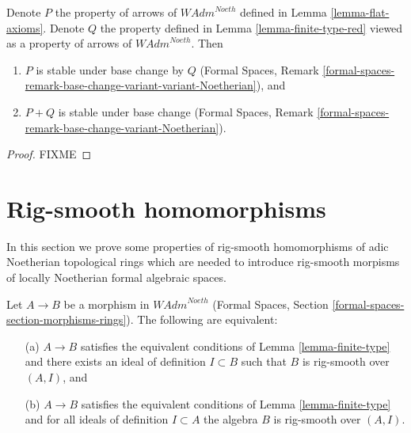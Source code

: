 \begin{lemma}
\label{lemma-base-change-flat-continuous}
Denote $P$ the property of arrows of $\textit{WAdm}^{Noeth}$
defined in Lemma \ref{lemma-flat-axioms}.
Denote $Q$ the property defined in Lemma \ref{lemma-finite-type-red}
viewed as a property of arrows of $\textit{WAdm}^{Noeth}$.
Then
\begin{enumerate}
\item $P$ is stable under base change by $Q$
(Formal Spaces, Remark
\ref{formal-spaces-remark-base-change-variant-variant-Noetherian}), and
\item $P + Q$ is stable under base change
(Formal Spaces, Remark
\ref{formal-spaces-remark-base-change-variant-Noetherian}).
\end{enumerate}
\end{lemma}

\begin{proof}
FIXME
\end{proof}










\section{Rig-smooth homomorphisms}
\label{section-rig-smooth-homomorphisms}

\noindent
In this section we prove some properties of
rig-smooth homomorphisms of adic Noetherian
topological rings which are needed to introduce
rig-smooth morpisms of locally Noetherian
formal algebraic spaces.

\begin{lemma}
\label{lemma-rig-smooth-continuous}
Let $A \to B$ be a morphism in $\textit{WAdm}^{Noeth}$
(Formal Spaces, Section \ref{formal-spaces-section-morphisms-rings}).
The following are equivalent:
\begin{enumerate}
\item[(a)] $A \to B$ satisfies the equivalent conditions of
Lemma \ref{lemma-finite-type} and there exists an ideal of definition
$I \subset B$ such that $B$ is rig-smooth over $(A, I)$, and
\item[(b)] $A \to B$ satisfies the equivalent conditions of
Lemma \ref{lemma-finite-type} and for all ideals of definition
$I \subset A$ the algebra $B$ is rig-smooth over $(A, I)$.
\end{enumerate}
\end{lemma}

